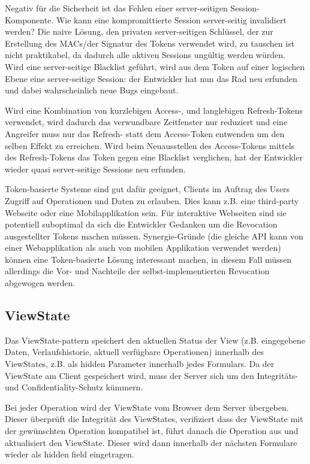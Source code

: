 Negativ für die Sicherheit ist das Fehlen einer server-seitigen Session-Komponente. Wie kann eine kompromittierte Session server-seitig invalidiert werden? Die naive Lösung, den privaten server-seitigen Schlüssel, der zur Erstellung des MACs/der Signatur des Tokens verwendet wird, zu tauschen ist nicht praktikabel, da dadurch alle aktiven Sessions ungültig werden würden. Wird eine server-seitige Blacklist geführt, wird aus dem Token auf einer logischen Ebene eine server-seitige Session: der Entwickler hat nun das Rad neu erfunden und dabei wahrscheinlich neue Bugs eingebaut.

Wird eine Kombination von kurzlebigen Access-, und langlebigen Refresh-Tokens verwendet, wird dadurch das verwundbare Zeitfenster nur reduziert und eine Angreifer muss nur das Refresh- statt dem Access-Token entwenden um den selben Effekt zu erreichen. Wird beim Neuausstellen des Access-Tokens mittels des Refresh-Tokens das Token gegen eine Blacklist verglichen, hat der Entwickler wieder quasi server-seitige Sessions neu erfunden.

Token-basierte Systeme sind gut dafür geeignet, Clients im Auftrag des Users Zugriff auf Operationen und Daten zu erlauben. Dies kann z.B. eine third-party Webseite oder eine Mobilapplikation sein. Für interaktive Webseiten sind sie potentiell suboptimal da sich die Entwickler Gedanken um die Revocation ausgestellter Tokens machen müssen. Synergie-Gründe (die gleiche API kann von einer Webapplikation als auch von mobilen Applikation verwendet werden) können eine Token-basierte Lösung interessant machen, in diesem Fall müssen allerdings die Vor- und Nachteile der selbst-implementierten Revocation abgewogen werden.

\subsection{ViewState}

Das ViewState-pattern speichert den aktuellen Status der View (z.B. eingegebene Daten, Verlaufshistorie, aktuell verfügbare Operationen) innerhalb des ViewStates, z.B. als hidden Parameter innerhalb jedes Formulars. Da der ViewState am Client gespeichert wird, muss der Server sich um den Integritäts- und Confidentiality-Schutz kümmern.

Bei jeder Operation wird der ViewState vom Browser dem Server übergeben. Dieser überprüft die Integrität des ViewStates, verifiziert dass der ViewState mit der gewünschten Operation kompatibel ist, führt danach die Operation aus und aktualisiert den ViewState. Dieser wird dann innerhalb der nächsten Formulare wieder als hidden field eingetragen.



